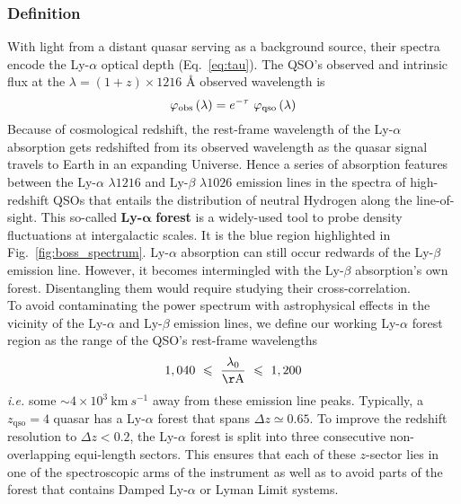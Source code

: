 \subsubsection{Definition}
\label{sec:def_lya}

With light from a distant quasar serving as a background source, their spectra encode the Ly-$\alpha$ optical depth (Eq.~\ref{eq:tau}). The QSO's observed and intrinsic flux at the $\lambda = (1+z) \times 1216$ {\AA} observed wavelength is
\begin{equation}
	\varphi_{\rm{obs}} \left(\lambda\right) = e^{- \tau} ~\varphi_{\rm{qso}} \left(\lambda\right)
		\label{eq:flux}
\end{equation} Because of cosmological redshift, the rest-frame wavelength of the Ly-$\alpha$ absorption gets redshifted from its observed wavelength as the quasar signal travels to Earth in an expanding Universe. Hence a series of absorption features  between the Ly-$\alpha$ $\lambda 1216$ and Ly-$\beta$ $\lambda 1026$ emission lines in the spectra of high-redshift QSOs that entails the distribution of neutral Hydrogen along the line-of-sight. This so-called \textbf{Ly-}$\pmb{\alpha}$ \textbf{forest} is a widely-used tool to probe density fluctuations at intergalactic scales. It is the blue region highlighted in Fig.~\ref{fig:boss_spectrum}. Ly-$\alpha$ absorption can still occur redwards of the Ly-$\beta$ emission line. However, it becomes intermingled with the Ly-$\beta$ absorption's own forest. Disentangling them would require studying their cross-correlation. \\

To avoid contaminating the power spectrum with astrophysical effects in the vicinity of the Ly-$\alpha$ and Ly-$\beta$ emission lines, we define our working Ly-$\alpha$ forest region as the range of the QSO's rest-frame wavelengths 
\begin{equation}
1,040~\leqslant ~ \frac{\lambda_0}{\mathrm{\AA}} ~\leqslant ~1,200
\end{equation} \textit{i.e.} some $\sim 4 \times 10^3~\mathrm{km}~s^{-1}$ away from these emission line peaks. Typically, a $z_{\mathrm{qso}} = 4$ quasar has a Ly-$\alpha$ forest that spans $\Delta z \simeq 0.65$. To improve the redshift resolution to $\Delta z < 0.2$, the Ly-$\alpha$ forest is split into three consecutive non-overlapping equi-length sectors. This ensures that each of these $z$-sector lies in one of the spectroscopic arms of the instrument as well as to avoid parts of the forest that contains Damped Ly-$\alpha$ or Lyman Limit systems. \\

